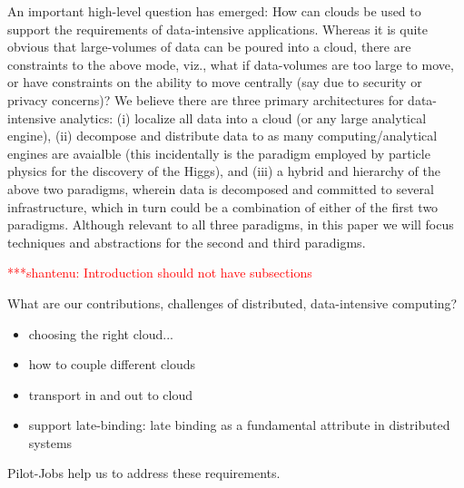 \documentclass[times]{cpeauth}
\newcommand{\jhanote}[1]{ {\textcolor{red} { ***shantenu: #1 }}}
\newcommand{\jhanote}[1]{}
\begin{document}
An important high-level question has emerged: How can clouds be used
to support the requirements of data-intensive applications. Whereas it
is quite obvious that large-volumes of data can be poured into a
cloud, there are constraints to the above mode, viz., what if
data-volumes are too large to move, or have constraints on the ability
to move centrally (say due to security or privacy concerns)? We
believe there are three primary architectures for data-intensive
analytics: (i) localize all data into a cloud (or any large analytical
engine), (ii) decompose and distribute data to as many
computing/analytical engines are avaialble (this incidentally is the
paradigm employed by particle physics for the discovery of the Higgs),
and (iii) a hybrid and hierarchy of the above two paradigms, wherein
data is decomposed and committed to several infrastructure, which in
turn could be a combination of either of the first two paradigms.
Although relevant to all three paradigms, in this paper we will focus
techniques and abstractions for the second and third paradigms.










\jhanote{Introduction should not have subsections}

What are our contributions, challenges of distributed, data-intensive computing?
\begin{itemize}
	\item choosing the right cloud... 
	\item how to couple different clouds
	\item transport in and out to cloud
	\item support late-binding: late binding as a fundamental attribute in 
	distributed systems
\end{itemize}
Pilot-Jobs help us to address these requirements.
\end{document}
